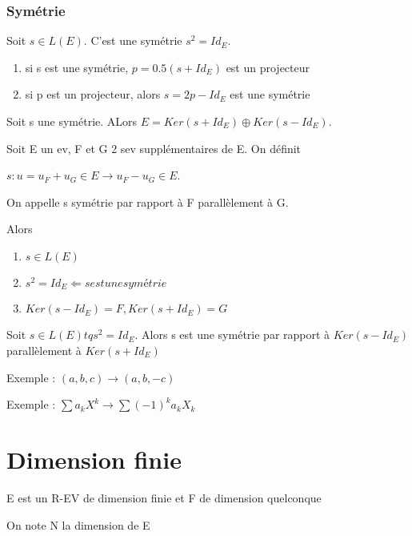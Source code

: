 \documentclass[french]{yLectureNote}
\begin{document}
\subsubsection{Symétrie}
\begin{definition}
Soit \(s\in L(E)\). C'est une symétrie \(s^2 = Id_E\).
\end{definition}
\begin{proposition}
\begin{enumerate}
 \item si s est une symétrie, \(p = 0.5(s+Id_E)\) est un projecteur
 \item si p est un projecteur, alors \(s = 2p-Id_E\) est une symétrie
\end{enumerate}
\end{proposition}
\begin{proposition}[Corollaire]
Soit s une symétrie. ALors \(E = Ker(s+Id_E)\oplus Ker(s-Id_E)\).
\end{proposition}
\begin{proposition}
Soit E un ev, F et G 2 sev supplémentaires de E. On définit

\(s : u = u_F+u_G\in E \to u_F-u_G\in E\).

On appelle s symétrie par rapport à F parallèlement à G.

Alors \begin{enumerate}
       \item \(s\in L(E)\)
       \item \(s^2=Id_E \Leftarrow s est une symétrie\)
       \item \(Ker(s-Id_E) = F, Ker(s+Id_E) =G\)
      \end{enumerate}
\end{proposition}
\begin{proposition}[Corollaire]
Soit \(s\in L(E) tq s^2 = Id_E\). Alors s est une symétrie par rapport à \(Ker(s-Id_E)\) parallèlement à \(Ker(s+Id_E)\)
\end{proposition}
Exemple : $(a,b,c)\to (a,b,-c)$

Exemple : $\sum a_k X^k \to \sum (-1)^k a_k X_k$
\section{Dimension finie}
E est un R-EV de dimension finie et F de dimension quelconque

On note N la dimension de E
\end{document}
